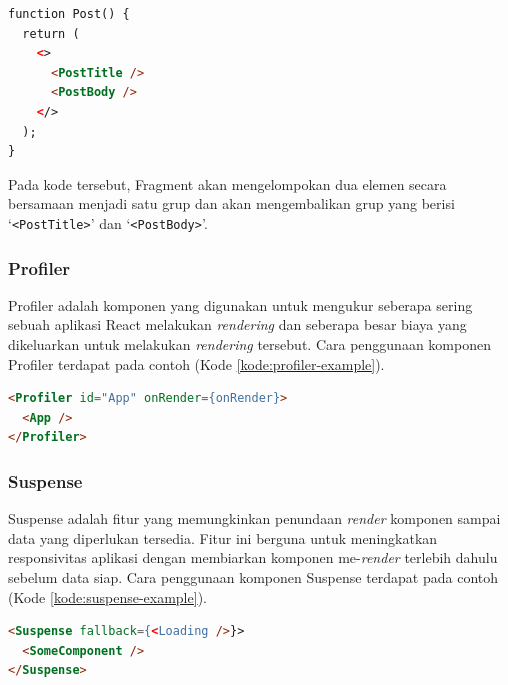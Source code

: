 \begin{lstlisting}[language=HTML, caption=Contoh Potongan Kode Fragment, label=kode:fragment-example]
function Post() {
  return (
    <>
      <PostTitle />
      <PostBody />
    </>
  );
}
\end{lstlisting}

Pada kode tersebut, Fragment akan mengelompokan dua elemen secara bersamaan menjadi satu grup dan akan mengembalikan grup yang berisi `\texttt{<PostTitle>}' dan `\texttt{<PostBody>}'.

\subsubsection{Profiler}
Profiler adalah komponen yang digunakan untuk mengukur seberapa sering sebuah aplikasi React melakukan \textit{rendering} dan seberapa besar biaya yang dikeluarkan untuk melakukan \textit{rendering} tersebut. Cara penggunaan komponen Profiler terdapat pada contoh (Kode \ref{kode:profiler-example}).

\begin{lstlisting}[language=HTML, caption=Contoh Potongan Kode Profiler, label=kode:profiler-example]
<Profiler id="App" onRender={onRender}>
  <App />
</Profiler>
\end{lstlisting}

\subsubsection{Suspense}
Suspense adalah fitur yang memungkinkan penundaan \textit{render} komponen sampai data yang diperlukan tersedia. Fitur ini berguna untuk meningkatkan responsivitas aplikasi dengan membiarkan komponen me-\textit{render} terlebih dahulu sebelum data siap. Cara penggunaan komponen Suspense terdapat pada contoh (Kode \ref{kode:suspense-example}).

\begin{lstlisting}[language=HTML, caption=Contoh Potongan Kode Suspense, label=kode:suspense-example]
<Suspense fallback={<Loading />}>
  <SomeComponent />
</Suspense>
\end{lstlisting}

